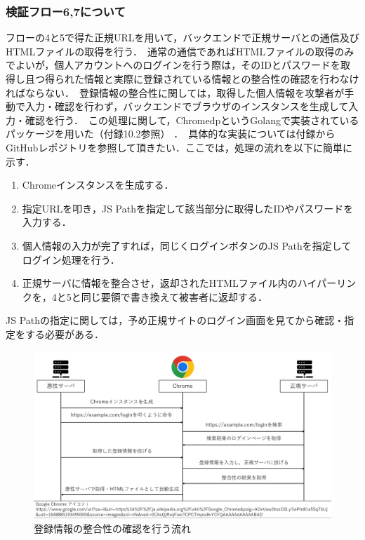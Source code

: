 \documentclass[dvipdfmx]{jsarticle}
\begin{document}
            \subsubsection{検証フロー6,7について}
                フローの4と5で得た正規URLを用いて，バックエンドで正規サーバとの通信及びHTMLファイルの取得を行う．\
                通常の通信であればHTMLファイルの取得のみでよいが，個人アカウントへのログインを行う際は，そのIDとパスワードを取得し且つ得られた情報と実際に登録されている情報との整合性の確認を行わなければならない．\
                登録情報の整合性に関しては，取得した個人情報を攻撃者が手動で入力・確認を行わず，バックエンドでブラウザのインスタンスを生成して入力・確認を行う．\
                この処理に関して，ChromedpというGolangで実装されているパッケージを用いた（付録10.2参照） ．\
                具体的な実装については付録からGitHubレポジトリを参照して頂きたい．ここでは，処理の流れを以下に簡単に示す．\
                \begin{enumerate}
                    \item Chromeインスタンスを生成する．
                    \item 指定URLを叩き，JS Pathを指定して該当部分に取得したIDやパスワードを入力する．
                    \item 個人情報の入力が完了すれば，同じくログインボタンのJS Pathを指定してログイン処理を行う．
                    \item 正規サーバに情報を整合させ，返却されたHTMLファイル内のハイパーリンクを，4と5と同じ要領で書き換えて被害者に返却する．
                \end{enumerate}
                JS Pathの指定に関しては，予め正規サイトのログイン画面を見てから確認・指定をする必要がある．\
                \begin{figure}[pth]
                    \centering
                    \includegraphics[width=15cm]{img/vc-vf-6-7.png}
                    \caption{登録情報の整合性の確認を行う流れ}
                    \label{flow-6-7}
                \end{figure}
                \clearpage
\end{document}

